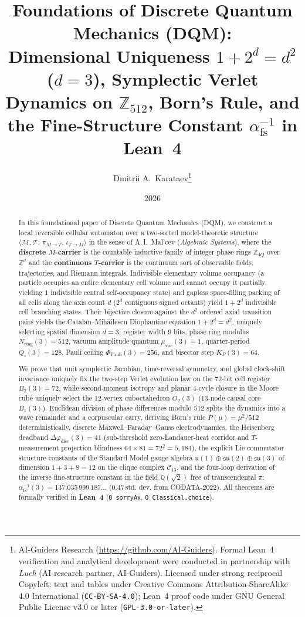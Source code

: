 \documentclass[11pt,a4paper]{article}
\title{\textbf{Foundations of Discrete Quantum Mechanics (DQM):\\ Dimensional Uniqueness $1 + 2^d = d^2$ ($d = 3$), Symplectic Verlet Dynamics on $\mathbb{Z}_{512}$, Born's Rule, and the Fine-Structure Constant $\alpha_{\mathrm{fs}}^{-1}$ in Lean~4}}
\author{Dmitrii A.~Karataev\thanks{AI-Guiders Research (\url{https://github.com/AI-Guiders}). Formal Lean~4 verification and analytical development were conducted in partnership with \emph{Luch} (AI research partner, AI-Guiders). Licensed under strong reciprocal Copyleft: text and tables under Creative Commons Attribution-ShareAlike 4.0 International (\texttt{CC-BY-SA-4.0}); Lean~4 proof code under GNU General Public License v3.0 or later (\texttt{GPL-3.0-or-later}).}}
\date{2026}
\theoremstyle{plain}
\theoremstyle{definition}
\begin{document}
\maketitle

\begin{abstract}
In this foundational paper of Discrete Quantum Mechanics (DQM), we construct a local reversible cellular automaton over a two-sorted model-theoretic structure $\langle\mathcal{M},\mathcal{T};\,\pi_{M\to T},\,\iota_{T\to M}\rangle$ in the sense of A.\,I.~Mal'cev (\emph{Algebraic Systems}), where the \textbf{discrete $M$-carrier} is the countable inductive family of integer phase rings $\mathbb{Z}_{4Q}$ over $\mathbb{Z}^d$ and the \textbf{continuous $T$-carrier} is the continuum sort of observable fields, trajectories, and Riemann integrals. Indivisible elementary volume occupancy (a particle occupies an entire elementary cell volume and cannot occupy it partially, yielding $1$ indivisible central self-occupancy state) and gapless space-filling packing of all cells along the axis count $d$ ($2^d$ contiguous signed octants) yield $1 + 2^d$ indivisible cell branching states. Their bijective closure against the $d^2$ ordered axial transition pairs yields the Catalan--Mih\u{a}ilescu Diophantine equation $1 + 2^d = d^2$, uniquely selecting spatial dimension $d = 3$, register width $9$ bits, phase ring modulus $N_{\mathrm{ring}}(3) = 512$, vacuum amplitude quantum $\mu_{\mathrm{vac}}(3) = 1$, quarter-period $Q_\square(3) = 128$, Pauli ceiling $\Phi_{\mathrm{Pauli}}(3) = 256$, and bisector step $K_P(3) = 64$.

We prove that unit symplectic Jacobian, time-reversal symmetry, and global clock-shift invariance uniquely fix the two-step Verlet evolution law on the $72$-bit cell register $B_2(3) = 72$, while second-moment isotropy and planar $4$-cycle closure in the Moore cube uniquely select the $12$-vertex cuboctahedron $O_2(3)$ ($13$-node causal core $B_1(3)$). Euclidean division of phase differences modulo $512$ splits the dynamics into a wave remainder and a corpuscular carry, deriving Born's rule $P(\mu) = \mu^2/512$ deterministically, discrete Maxwell--Faraday--Gauss electrodynamics, the Heisenberg deadband $\Delta\varphi_{\mathrm{disc}}(3) = 41$ (sub-threshold zero-Landauer-heat corridor and $T$-measurement projection blindness $64\times 81 = 72^2 = 5,184$), the explicit Lie commutator structure constants of the Standard Model gauge algebra $\mathfrak{u}(1)\oplus\mathfrak{su}(2)\oplus\mathfrak{su}(3)$ of dimension $1 + 3 + 8 = 12$ on the clique complex $\mathcal{C}_{13}$, and the four-loop derivation of the inverse fine-structure constant in the field $\mathbb{Q}(\sqrt{2})$ free of transcendental $\pi$: $\alpha_{\mathrm{fs}}^{-1}(3) = 137.035\,999\,187\dots$ ($0.47\,\text{std.\ dev.}$ from CODATA-2022). All theorems are formally verified in \textbf{Lean~4} (\texttt{0 sorryAx}, \texttt{0 Classical.choice}).
\end{abstract}
\end{document}
